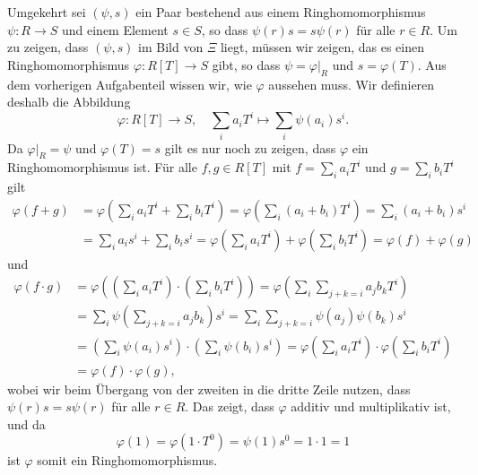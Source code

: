 \documentclass[a4paper, 10pt, numbers=noenddot]{scrartcl}
\begin{document}
Umgekehrt sei $(\psi, s)$ ein Paar bestehend aus einem Ringhomomorphismus $\psi \colon R \to S$ und einem Element $s \in S$, so dass $\psi(r) s = s \psi(r)$ für alle $r \in R$.
Um zu zeigen, dass $(\psi, s)$ im Bild von $\Xi$ liegt, müssen wir zeigen, das es einen Ringhomomorphismus $\varphi \colon R[T] \to S$ gibt, so dass $\psi = \varphi|_R$ und $s = \varphi(T)$.
Aus dem vorherigen Aufgabenteil wissen wir, wie $\varphi$ aussehen muss.
Wir definieren deshalb die Abbildung
\[
  \varphi \colon R[T] \to S,
  \quad
  \sum_i a_i T^i \mapsto \sum_i \psi(a_i) s^i.
\]
Da $\varphi|_R = \psi$ und $\varphi(T) = s$ gilt es nur noch zu zeigen, dass $\varphi$ ein Ringhomomorphismus ist.
Für alle $f, g \in R[T]$ mit $f = \sum_i a_i T^i$ und $g = \sum_i b_i T^i$ gilt
\begin{align*}
      \varphi(f + g)
  &=  \varphi\left( \sum_i a_i T^i + \sum_i b_i T^i \right)
   =  \varphi\left( \sum_i (a_i + b_i) T^i \right)
   =  \sum_i (a_i + b_i) s^i
  \\
  &=  \sum_i a_i s^i + \sum_i b_i s^i
   =  \varphi\left( \sum_i a_i T^i \right) + \varphi\left( \sum_i b_i T^i \right)
   =  \varphi(f) + \varphi(g)
\end{align*}
und
\begin{align*}
    \varphi(f \cdot g)
  &= \varphi\left( \left( \sum_i a_i T^i \right) \cdot \left( \sum_i b_i T^i \right) \right)
   = \varphi\left( \sum_i \sum_{j + k = i} a_j b_k T^i \right)
  \\
  &= \sum_i \psi\left( \sum_{j + k = i} a_j b_k \right) s^i
   = \sum_i \sum_{j + k = i} \psi(a_j) \psi(b_k) s^i
  \\
  &= \left( \sum_i \psi(a_i) s^i \right) \cdot \left( \sum_i \psi(b_i) s^i \right)
   = \varphi\left( \sum_i a_i T^i \right) \cdot \varphi\left( \sum_i b_i T^i \right)
  \\
  &= \varphi(f) \cdot \varphi(g),
\end{align*}
wobei wir beim Übergang von der zweiten in die dritte Zeile nutzen, dass $\psi(r) s = s \psi(r)$ für alle $r \in R$.
Das zeigt, dass $\varphi$ additiv und multiplikativ ist, und da
\[
    \varphi(1)
  = \varphi(1 \cdot T^0)
  = \psi(1) s^0
  = 1 \cdot 1
  = 1
\]
ist $\varphi$ somit ein Ringhomomorphismus.





\subsection{}
\end{document}
